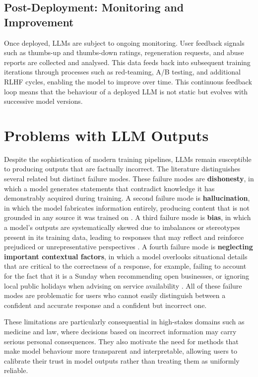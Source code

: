 \subsection{Post-Deployment: Monitoring and Improvement}

Once deployed, LLMs are subject to ongoing monitoring. User feedback signals such as thumbs-up and thumbs-down ratings, regeneration requests, and abuse reports are collected and analysed. This data feeds back into subsequent training iterations through processes such as red-teaming, A/B testing, and additional RLHF cycles, enabling the model to improve over time. This continuous feedback loop means that the behaviour of a deployed LLM is not static but evolves with successive model versions.

\section{Problems with LLM Outputs}

Despite the sophistication of modern training pipelines, LLMs remain susceptible to producing outputs that are factually incorrect. The literature distinguishes several related but distinct failure modes. These failure modes are \textbf{dishonesty}, in which a model generates statements that contradict knowledge it has demonstrably acquired during training. A second failure mode is \textbf{hallucination}, in which the model fabricates information entirely, producing content that is not grounded in any source it was trained on \cite{wu_usable_2025}. A third failure mode is \textbf{bias}, in which a model's outputs are systematically skewed due to imbalances or stereotypes present in its training data, leading to responses that may reflect and reinforce prejudiced or unrepresentative perspectives \cite{yeh_evaluating_2023, zhou_ethical_2024}. A fourth failure mode is \textbf{neglecting important contextual factors}, in which a model overlooks situational details that are critical to the correctness of a response, for example, failing to account for the fact that it is a Sunday when recommending open businesses, or ignoring local public holidays when advising on service availability \cite{zhou_ethical_2024}. All of these failure modes are problematic for users who cannot easily distinguish between a confident and accurate response and a confident but incorrect one.

These limitations are particularly consequential in high-stakes domains such as medicine and law, where decisions based on incorrect information may carry serious personal consequences. They also motivate the need for methods that make model behaviour more transparent and interpretable, allowing users to calibrate their trust in model outputs rather than treating them as uniformly reliable.

